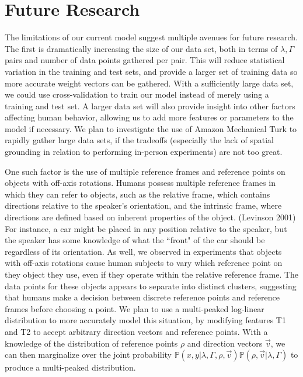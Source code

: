 \documentclass[12pt,letterpaper]{article}
\newcommand\prob{\mathbb{P}}
\begin{document}
\section{Future Research}

The limitations of our current model suggest multiple avenues for future research. The first is dramatically increasing the size of our data set, both in terms of $\lambda, \Gamma$ pairs and number of data points gathered per pair. This will reduce statistical variation in the training and test sets, and provide a larger set of training data so more accurate weight vectors can be gathered. With a sufficiently large data set, we could use cross-validation to train our model instead of merely using a training and test set. A larger data set will also provide insight into other factors affecting human behavior, allowing us to add more features or parameters to the model if necessary. We plan to investigate the use of Amazon Mechanical Turk to rapidly gather large data sets, if the tradeoffs (especially the lack of spatial grounding in relation to performing in-person experiments) are not too great. 

One such factor is the use of multiple reference frames and reference points on objects with off-axis rotations. Humans possess multiple reference frames in which they can refer to objects, such as the relative frame, which contains directions relative to the speaker's orientation, and the intrinsic frame, where directions are defined based on inherent properties of the object. (Levinson 2001) For instance, a car might be placed in any position relative to the speaker, but the speaker has some knowledge of what the ``front" of the car should be regardless of its orientation. As well, we observed in experiments that objects with off-axis rotations cause human subjects to vary which reference point on they object they use, even if they operate within the relative reference frame. The data points for these objects appears to separate into distinct clusters, suggesting that humans make a decision between discrete reference points and reference frames before choosing a point. We plan to use a multi-peaked log-linear distribution to more accurately model this situation, by modifying features T1 and T2 to accept arbitrary direction vectors and reference points. With a knowledge of the distribution of reference points $\rho$ and direction vectors $\vec{v}$, we can then marginalize over the joint probability $\prob(x, y | \lambda,\Gamma, \rho, \vec{v} )\prob(\rho, \vec{v} | \lambda, \Gamma)$ to produce a multi-peaked distribution. 
\end{document}
